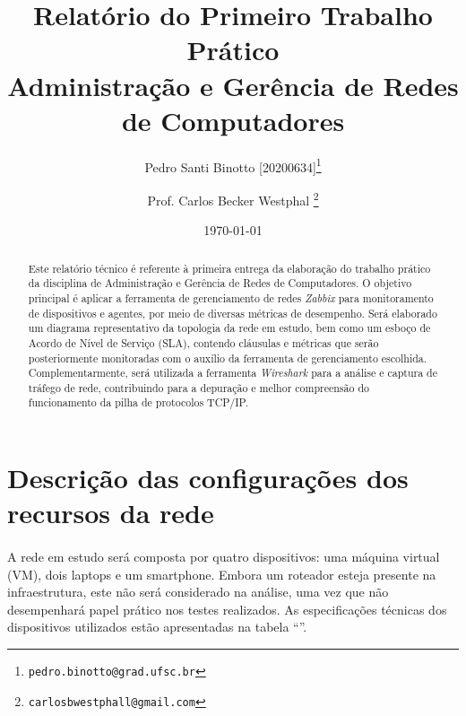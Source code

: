 \documentclass[12pt]{article}
\title{Relatório do Primeiro Trabalho Prático \\ [0.2em]\smaller{}Administração e Gerência de Redes de Computadores}
\author[1]{Pedro Santi Binotto [20200634]\thanks{\texttt{pedro.binotto@grad.ufsc.br}}}
\author[1]{Prof. Carlos Becker Westphal \thanks{\texttt{carlosbwestphall@gmail.com}}}
\date{\today}
\affil[1]{Departamento de Informática e Estatística, Centro Tecnológico \protect\\ Universidade Federal de Santa Catarina}
\begin{document}
\begin{titlepage}
\maketitle
\thispagestyle{empty}

\begin{abstract}
Este relatório técnico é referente à primeira entrega da elaboração do trabalho prático da disciplina de Administração e
Gerência de Redes de Computadores. O objetivo principal é aplicar a ferramenta de gerenciamento de redes \textit{Zabbix}
para monitoramento de dispositivos e agentes, por meio de diversas métricas de desempenho. Será elaborado um
diagrama representativo da topologia da rede em estudo, bem como um esboço de Acordo de Nível de Serviço (SLA), contendo
cláusulas e métricas que serão posteriormente monitoradas com o auxílio da ferramenta de gerenciamento escolhida.
Complementarmente, será utilizada a ferramenta \textit{Wireshark } para a análise e captura de tráfego de rede, contribuindo para
a depuração e melhor compreensão do funcionamento da pilha de protocolos TCP/IP.
\end{abstract}

\end{titlepage}

\tableofcontents

\printglossary[title=Glossário, toctitle=Glossário]

\section{Descrição das configurações dos recursos da rede}
\paragraph{}
A rede em estudo será composta por quatro dispositivos: uma máquina virtual (VM), dois laptops e um smartphone. Embora
um roteador esteja presente na infraestrutura, este não será considerado na análise, uma vez que não desempenhará papel
prático nos testes realizados. As especificações técnicas dos dispositivos utilizados estão apresentadas na tabela
``''.
\end{document}
